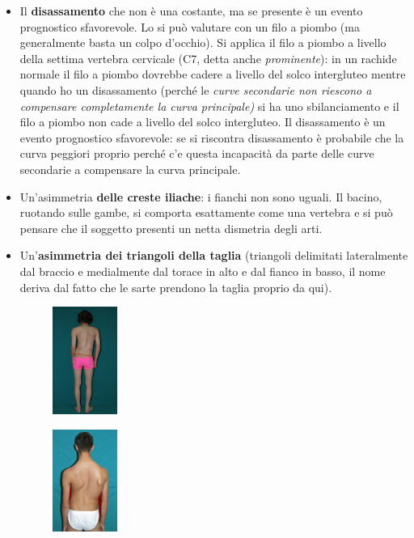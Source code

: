 \begin{itemize}
\item
  Il \textbf{disassamento} che non è una costante, ma se presente è un
  evento prognostico sfavorevole. Lo si può valutare con un filo a
  piombo (ma generalmente basta un colpo d'occhio). Si applica il filo a
  piombo a livello della settima vertebra cervicale (C7, detta anche
  \emph{prominente}): in un rachide normale il filo a piombo dovrebbe
  cadere a livello del solco intergluteo mentre quando ho un
  disassamento (perché le \emph{curve secondarie non riescono a
  compensare completamente la curva principale)} si ha uno
  sbilanciamento e il filo a piombo non cade a livello del solco
  intergluteo. Il disassamento è un evento prognostico sfavorevole: se
  si riscontra disassamento è probabile che la curva peggiori proprio
  perché c'e questa incapacità da parte delle curve secondarie a
  compensare la curva principale.
\item
  Un'asimmetria \textbf{delle creste iliache}: i fianchi non sono
  uguali. Il bacino, ruotando sulle gambe, si comporta esattamente come
  una vertebra e si può pensare che il soggetto presenti un netta
  dismetria degli arti.
\item
  Un'\textbf{asimmetria dei triangoli della taglia} (triangoli
  delimitati lateralmente dal braccio e medialmente
  dal torace in alto e dal fianco in basso, il nome deriva dal fatto che
  le sarte prendono la taglia proprio da
  qui).
  \begin{figure}[!ht]
  \centering
  	\includegraphics[width=0.2\textwidth]{012/image24.png}
  \end{figure}
  \begin{figure}[!ht]
  \centering
  	\includegraphics[width=0.2\textwidth]{012/image25.png}

\end{figure}
\end{itemize}
